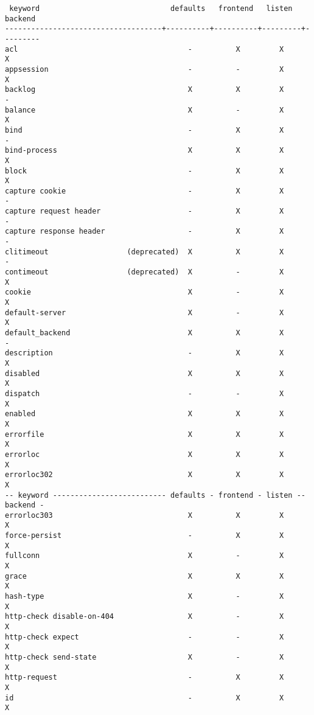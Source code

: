 \begin{verbatim}
 keyword                              defaults   frontend   listen    backend
------------------------------------+----------+----------+---------+---------
acl                                       -          X         X         X
appsession                                -          -         X         X
backlog                                   X          X         X         -
balance                                   X          -         X         X
bind                                      -          X         X         -
bind-process                              X          X         X         X
block                                     -          X         X         X
capture cookie                            -          X         X         -
capture request header                    -          X         X         -
capture response header                   -          X         X         -
clitimeout                  (deprecated)  X          X         X         -
contimeout                  (deprecated)  X          -         X         X
cookie                                    X          -         X         X
default-server                            X          -         X         X
default_backend                           X          X         X         -
description                               -          X         X         X
disabled                                  X          X         X         X
dispatch                                  -          -         X         X
enabled                                   X          X         X         X
errorfile                                 X          X         X         X
errorloc                                  X          X         X         X
errorloc302                               X          X         X         X
-- keyword -------------------------- defaults - frontend - listen -- backend -
errorloc303                               X          X         X         X
force-persist                             -          X         X         X
fullconn                                  X          -         X         X
grace                                     X          X         X         X
hash-type                                 X          -         X         X
http-check disable-on-404                 X          -         X         X
http-check expect                         -          -         X         X
http-check send-state                     X          -         X         X
http-request                              -          X         X         X
id                                        -          X         X         X

\end{verbatim}

